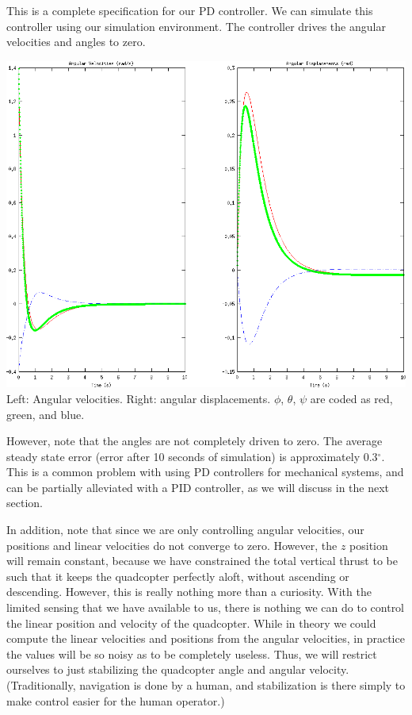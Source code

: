 \documentclass{article}
\begin{document}
This is a complete specification for our PD controller. We can simulate this controller using our simulation environment. 
The controller drives the angular velocities and angles to zero.
\begin{center}
    \includegraphics[scale=0.9]{images/pd_controller.png} \\
    {
        Left: Angular velocities. Right: angular displacements. $\phi$, $\theta$, $\psi$ are coded as red, green, and blue.
    }
\end{center}
However, note that the angles are not completely driven to zero. The average steady state error
(error after 10 seconds of simulation) is approximately 0.3$^\circ$. This is a common problem with
using PD controllers for mechanical systems, and can be partially alleviated with a PID controller,
as we will discuss in the next section.

In addition, note that since we are only controlling angular velocities, our positions and linear velocities do
not converge to zero. However, the $z$ position will remain constant, because we have constrained
the total vertical thrust to be such that it keeps the quadcopter perfectly aloft, without ascending
or descending. However, this is really nothing more than a curiosity. With the limited sensing that we have
available to us, there is nothing we can do to control the linear position and velocity of the
quadcopter. While in theory we could compute the linear velocities and positions from the angular
velocities, in practice the values will be so noisy as to be completely useless. Thus, we will
restrict ourselves to just stabilizing the quadcopter angle and angular velocity. (Traditionally,
navigation is done by a human, and stabilization is there simply to make control easier for the
human operator.)
\end{document}
